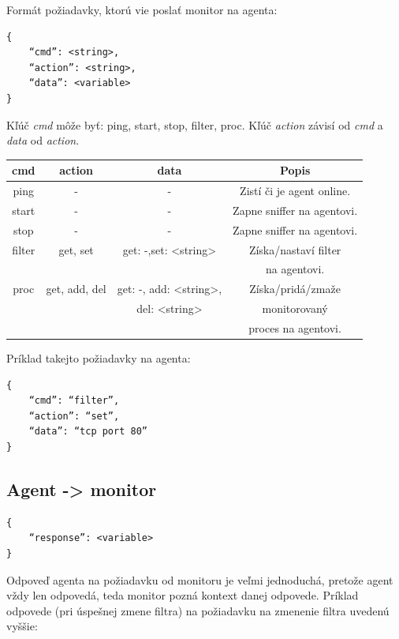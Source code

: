 \documentclass[a4paper,12pt]{article}
\begin{document}
Formát požiadavky, ktorú vie poslať monitor na agenta:

\begin{lstlisting}
{
	“cmd”: <string>,
	“action”: <string>,
	“data”: <variable> 
}

\end{lstlisting}

Kľúč \textit{cmd} môže byť: ping, start, stop, filter, proc. Kľúč \textit{action} závisí od \textit{cmd} a \textit{data} od \textit{action}.

\begin{table}[h!]
	\centering
	\begin{tabular}{|c|c|c|c|}
		\hline
		\textbf{cmd} & \textbf{action} & \textbf{data} & \textbf{Popis}  \\
		\hline
		ping & - & - & Zistí či je agent online. \\
		\hline
		start & - & - & Zapne sniffer na agentovi.  \\
		\hline
		stop & - & - & Zapne sniffer na agentovi.  \\
		\hline
		filter & get, set & get: -,set: <string> & Získa/nastaví filter \\
		& & & na agentovi.  \\
		\hline
		proc &  get, add, del & get: -, add: <string>, & Získa/pridá/zmaže \\
		& &  del: <string> &  monitorovaný\\
		& & & proces na agentovi. \\ 
		\hline
		
	\end{tabular}
	\label{Tab:1}
\end{table}

\noindent Príklad takejto požiadavky na agenta:

\begin{lstlisting}
{
	“cmd”: “filter”, 
	“action”: “set”, 
	“data”: “tcp port 80” 
}
\end{lstlisting}


\subsection{Agent -> monitor}
\begin{lstlisting}
{
	“response”: <variable> 
}
\end{lstlisting}


Odpoveď agenta na požiadavku od monitoru je veľmi jednoduchá, pretože agent vždy len odpovedá, teda monitor pozná kontext danej odpovede. Príklad odpovede (pri úspešnej zmene filtra) na požiadavku na zmenenie filtra uvedenú vyššie:
\end{document}
